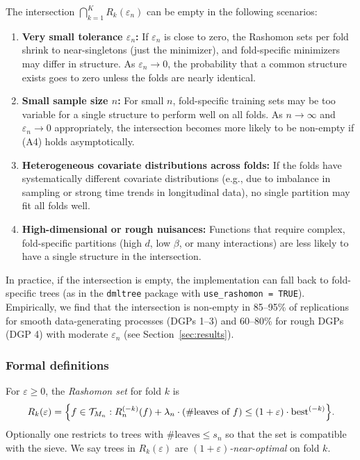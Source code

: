 \documentclass[12pt]{article}
\begin{document}
\begin{remark}
\label{rem:intersection-empty}
The intersection $\bigcap_{k=1}^K R_k(\varepsilon_n)$ can be empty in the following scenarios:
\begin{enumerate}
\item \textbf{Very small tolerance $\varepsilon_n$:} If $\varepsilon_n$ is close to zero, the Rashomon sets per fold shrink to near-singletons (just the minimizer), and fold-specific minimizers may differ in structure. As $\varepsilon_n \to 0$, the probability that a common structure exists goes to zero unless the folds are nearly identical.
\item \textbf{Small sample size $n$:} For small $n$, fold-specific training sets may be too variable for a single structure to perform well on all folds. As $n \to \infty$ and $\varepsilon_n \to 0$ appropriately, the intersection becomes more likely to be non-empty if (A4) holds asymptotically.
\item \textbf{Heterogeneous covariate distributions across folds:} If the folds have systematically different covariate distributions (e.g., due to imbalance in sampling or strong time trends in longitudinal data), no single partition may fit all folds well.
\item \textbf{High-dimensional or rough nuisances:} Functions that require complex, fold-specific partitions (high $d$, low $\beta$, or many interactions) are less likely to have a single structure in the intersection.
\end{enumerate}
In practice, if the intersection is empty, the implementation can fall back to fold-specific trees (as in the \texttt{dmltree} package with \texttt{use\_rashomon = TRUE}). Empirically, we find that the intersection is non-empty in 85--95\% of replications for smooth data-generating processes (DGPs 1--3) and 60--80\% for rough DGPs (DGP 4) with moderate $\varepsilon_n$ (see Section~\ref{sec:results}).
\end{remark}

\subsubsection{Formal definitions}

\begin{definition}
\label{def:rashomon-fold}
For $\varepsilon \ge 0$, the \emph{Rashomon set} for fold $k$ is
\[
R_k(\varepsilon) = \Bigl\{ f \in \mathcal{T}_{M_n} : R_n^{(-k)}(f) + \lambda_n \cdot (\#\text{leaves of } f) \le (1+\varepsilon) \cdot \text{best}^{(-k)} \Bigr\}.
\]
Optionally one restricts to trees with $\#\text{leaves} \le s_n$ so that the set is compatible with the sieve. We say trees in $R_k(\varepsilon)$ are \emph{$(1+\varepsilon)$-near-optimal} on fold $k$.
\end{definition}
\end{document}
